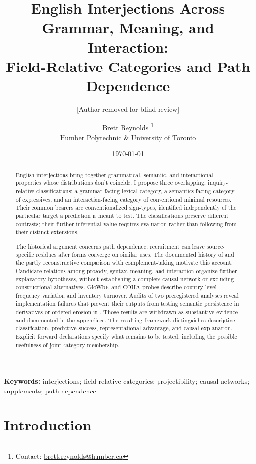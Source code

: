 \documentclass[12pt]{article}
\title{English Interjections Across Grammar, Meaning, and Interaction:\\
Field-Relative Categories and Path Dependence}
\author{[Author removed for blind review]}
\author{Brett Reynolds \orcidlink{0000-0003-0073-7195}%
\thanks{Contact: \href{mailto:brett.reynolds@humber.ca}{brett.reynolds@humber.ca}}\\
Humber Polytechnic \& University of Toronto}
\date{\today}
\begin{document}
\maketitle

\begin{abstract}
English interjections bring together grammatical, semantic, and interactional properties whose distributions don't coincide. I propose three overlapping, inquiry-relative classifications: a grammar-facing lexical category, a semantics-facing category of expressives, and an interaction-facing category of conventional minimal resources. Their common bearers are conventionalized sign-types, identified independently of the particular target a prediction is meant to test. The classifications preserve different contrasts; their further inferential value requires evaluation rather than following from their distinct extensions.

The historical argument concerns path dependence: recruitment can leave source-specific residues after forms converge on similar uses. The documented history of  and the partly reconstructive comparison with complement-taking  motivate this account. Candidate relations among prosody, syntax, meaning, and interaction organize further explanatory hypotheses, without establishing a complete causal network or excluding constructional alternatives. GloWbE and COHA probes describe country-level frequency variation and inventory turnover. Audits of two preregistered analyses reveal implementation failures that prevent their outputs from testing semantic persistence in derivatives or ordered erosion in . Those results are withdrawn as substantive evidence and documented in the appendices. The resulting framework distinguishes descriptive classification, predictive success, representational advantage, and causal explanation. Explicit forward declarations specify what remains to be tested, including the possible usefulness of joint category membership.
\end{abstract}

\noindent\textbf{Keywords:} interjections; field-relative categories; projectibility; causal networks; supplements; path dependence


\section{Introduction}\label{sec:intro}
\end{document}
